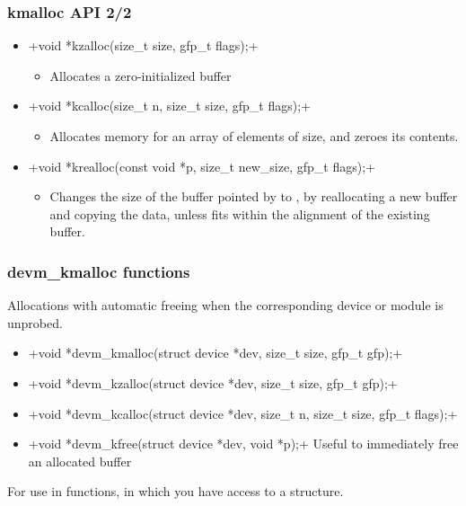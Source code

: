 \begin{frame}[fragile]
  \frametitle{kmalloc API 2/2}
  \begin{itemize}
  \item {}+void *kzalloc(size_t size, gfp_t flags);+
    \begin{itemize}
    \item Allocates a zero-initialized buffer
    \end{itemize}
  \item {}+void *kcalloc(size_t n, size_t size, gfp_t flags);+
    \begin{itemize}
    \item Allocates memory for an array of  elements of
       size, and zeroes its contents.
    \end{itemize}
  \item {}+void *krealloc(const void *p, size_t new_size, gfp_t flags);+
    \begin{itemize}
    \item Changes the size of the buffer pointed by  to
      , by reallocating a new buffer and copying the
      data, unless  fits within the alignment of
      the existing buffer.
    \end{itemize}
  \end{itemize}
\end{frame}

\begin{frame}
  \frametitle{devm\_kmalloc functions}
  Allocations with automatic freeing when the corresponding device or module is unprobed.
  \begin{itemize}
  \small
  \item {}+void *devm_kmalloc(struct device *dev, size_t size, gfp_t gfp);+
  \item {}+void *devm_kzalloc(struct device *dev, size_t size, gfp_t gfp);+
  \item {}+void *devm_kcalloc(struct device *dev, size_t n, size_t size, gfp_t flags);+
  \item {}+void *devm_kfree(struct device *dev, void *p);+
        Useful to immediately free an allocated buffer
  \end{itemize}
  \normalsize
  For use in  functions, in which you have access to a
   structure.
\end{frame}


